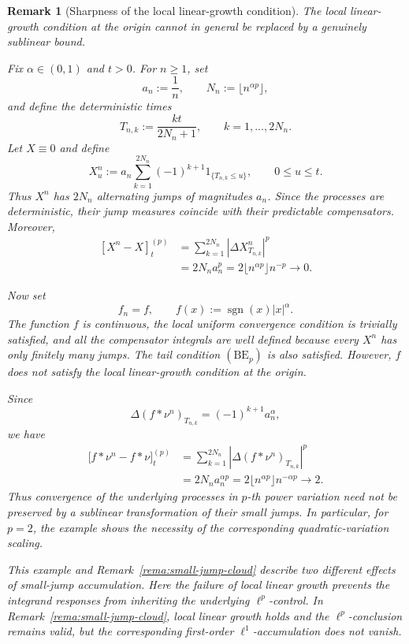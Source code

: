\documentclass[a4paper,10pt]{article}
\newtheorem{rema}[thm]{Remark}
\begin{document}
\begin{rema}[Sharpness of the local linear-growth condition]
The local linear-growth condition at the origin cannot in general be
replaced by a genuinely sublinear bound.

Fix \(\alpha\in(0,1)\) and \(t>0\). For \(n\ge1\), set
\[
        a_n:=\frac1n,
        \qquad
        N_n:=\lfloor n^{\alpha p}\rfloor,
\]
and define the deterministic times
\[
        T_{n,k}:=\frac{kt}{2N_n+1},
        \qquad k=1,\ldots,2N_n.
\]
Let \(X\equiv0\) and define
\[
X_u^n
:=
a_n
\sum_{k=1}^{2N_n}
(-1)^{k+1}
1_{\{T_{n,k}\le u\}},
\qquad 0\le u\le t.
\]
Thus \(X^n\) has \(2N_n\) alternating jumps of magnitudes \(a_n\).
Since the processes are deterministic, their jump measures coincide
with their predictable compensators. Moreover,
\[
\begin{aligned}
[X^n-X]^{(p)}_t
&=
\sum_{k=1}^{2N_n}
|\Delta X^n_{T_{n,k}}|^p
\\
&=
2N_na_n^p
=
2\lfloor n^{\alpha p}\rfloor n^{-p}
\longrightarrow0.
\end{aligned}
\]

Now set
\[
        f_n=f,
        \qquad
        f(x):=\operatorname{sgn}(x)|x|^\alpha.
\]
The function \(f\) is continuous, the local uniform convergence
condition is trivially satisfied, and all the compensator integrals
are well defined because every \(X^n\) has only finitely many jumps.
The tail condition \((\mathrm{BE}_p)\) is also satisfied. However,
\(f\) does not satisfy the local linear-growth condition at the
origin.

Since
\[
        \Delta(f*\nu^n)_{T_{n,k}}
        =
        (-1)^{k+1}a_n^\alpha,
\]
we have
\[
\begin{aligned}
\bigl[f*\nu^n-f*\nu\bigr]^{(p)}_t
&=
\sum_{k=1}^{2N_n}
\left|
\Delta(f*\nu^n)_{T_{n,k}}
\right|^p
\\
&=
2N_na_n^{\alpha p}
=
2\lfloor n^{\alpha p}\rfloor n^{-\alpha p}
\longrightarrow2.
\end{aligned}
\]
Thus convergence of the underlying processes in \(p\)-th power
variation need not be preserved by a sublinear transformation of their
small jumps. In particular, for \(p=2\), the example shows the
necessity of the corresponding quadratic-variation scaling.

This example and Remark~\ref{rema:small-jump-cloud} describe two
different effects of small-jump accumulation. Here the failure of
local linear growth prevents the integrand responses from inheriting
the underlying \(\ell^p\)-control. In
Remark~\ref{rema:small-jump-cloud}, local linear growth holds and the
\(\ell^p\)-conclusion remains valid, but the corresponding
first-order \(\ell^1\)-accumulation does not vanish.
\end{rema}
\end{document}

